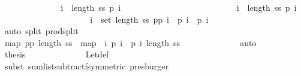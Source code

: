 \begin{isabellebody}
\ \ \ \ \ \ \ \ \isamarkupfalse%
\ \isamarkupfalse%
\ {\isachardoublequoteopen}{\isachardot}{\isachardot}{\isachardot}\ {\isacharequal}\ {\isacharparenleft}{\isasymSum}\ i\ {\isasymleftarrow}\ {\isacharbrackleft}{}{\isachardot}{\isachardot}{\isacharless}length\ ss{\isacharbrackright}{\isachardot}\ {\isacharquery}p{}\ i{\isacharparenright}\ {\isacharminus}\isanewline
\ \ \ \ \ \ \ \ \ \ \ \ \ \ \ \ \ \ \ \ \ \ \ \ \ {\isacharparenleft}{\isasymSum}\ i\ {\isasymleftarrow}\ {\isacharbrackleft}{}{\isachardot}{\isachardot}{\isacharless}length\ ss{\isacharbrackright}{\isachardot}\ {\isacharquery}p{}\ i{\isacharparenright}{\isachardoublequoteclose}\isanewline
\ \ \ \ \ \ \ \ \isamarkupfalse%
{\isacharminus}\isanewline
\ \ \ \ \ \ \ \ \ \ \isamarkupfalse%
\ {\isachardoublequoteopen}{\isasymforall}\ i\ {\isasymin}\ set\ {\isacharbrackleft}{}{\isachardot}{\isachardot}{\isacharless}length\ ss{\isacharbrackright}{\isachardot}\ {\isacharquery}p{}p{}\ i\ {\isacharequal}\ {\isacharquery}p{}\ i\ {\isacharminus}\ {\isacharquery}p{}\ i{\isachardoublequoteclose}\isanewline
\ \ \ \ \ \ \ \ \ \ \ \ \isamarkupfalse%
\ {\isacharparenleft}auto\ split{\isacharcolon}\ prod{\isachardot}split{\isacharparenright}\isanewline
\ \ \ \ \ \ \ \ \ \ \isamarkupfalse%
\ {\isachardoublequoteopen}map\ {\isacharquery}p{}p{}\ {\isacharbrackleft}{}{\isachardot}{\isachardot}{\isacharless}length\ ss{\isacharbrackright}\ {\isacharequal}\ map\ {\isacharparenleft}{\isasymlambda}\ i{\isachardot}\ {\isacharquery}p{}\ i\ {\isacharminus}\ {\isacharquery}p{}\ i{\isacharparenright}\ {\isacharbrackleft}{}{\isachardot}{\isachardot}{\isacharless}length\ ss{\isacharbrackright}{\isachardoublequoteclose}\isanewline
\ \ \ \ \ \ \ \ \ \ \ \ \isamarkupfalse%
\ auto\isanewline
\ \ \ \ \ \ \ \ \ \ \isamarkupfalse%
\ {\isacharquery}thesis\isanewline
\ \ \ \ \ \ \ \ \ \ \ \ \isamarkupfalse%
\ Let{\isacharunderscore}def\isanewline
\ \ \ \ \ \ \ \ \ \ \ \ \isamarkupfalse%
\ {\isacharparenleft}subst\ sum{\isacharunderscore}list{\isacharunderscore}subtractf{\isacharbrackleft}symmetric{\isacharbrackright}{\isacharcomma}\ presburger{\isacharparenright}\isanewline
\ \ \ \ \ \ \ \ \isamarkupfalse%
\isanewline
\ \ \ \ \ \ \ \ \isamarkupfalse%
\ \isamarkupfalse%

\end{isabellebody}
